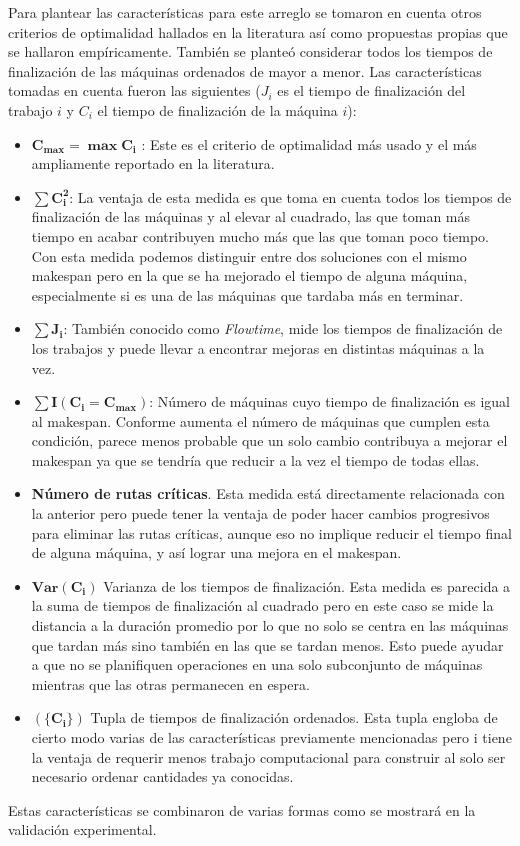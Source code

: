 Para plantear las características para este arreglo se tomaron en cuenta otros criterios de optimalidad hallados en la literatura así como propuestas 
propias que se hallaron empíricamente. 
%
También se planteó considerar todos los tiempos de finalización de las máquinas ordenados de mayor a menor.
%
Las características tomadas en cuenta fueron las siguientes ($J_i$ es el tiempo de finalización del trabajo $i$ y $C_i$ el tiempo de finalización de la máquina $i$):
\begin{itemize}
    \item $\mathbf{C_{max} = \max{C_i}}$ : Este es el criterio de optimalidad más usado y el más ampliamente reportado en la literatura. 
    \item $\mathbf{\sum C_i^2}$: La ventaja de esta medida es que toma en cuenta todos los tiempos de finalización de las máquinas y al elevar al cuadrado, 
		las que toman más tiempo en acabar contribuyen mucho más que las que toman poco tiempo. Con esta medida podemos distinguir entre dos soluciones con el mismo makespan 
		pero en la que se ha mejorado el tiempo de alguna máquina, especialmente si es una de las máquinas que tardaba más en terminar.
    \item $\mathbf{\sum J_i}$: También conocido como \textit{Flowtime}, mide los tiempos de finalización de los trabajos y puede llevar a encontrar mejoras en distintas 
		máquinas a la vez.
    \item $\mathbf{\sum I(C_i=C_{max})}$: Número de máquinas cuyo tiempo de finalización es igual al makespan. Conforme aumenta el número de máquinas que cumplen esta 
		condición, parece menos probable que un solo cambio contribuya a mejorar el makespan ya que se tendría que reducir a la vez el tiempo de todas ellas. 
    \item \textbf{Número de rutas críticas}. Esta medida está directamente relacionada con la anterior pero puede tener la ventaja de poder hacer cambios progresivos 
		para eliminar las rutas críticas, aunque eso no implique reducir el tiempo final de alguna máquina, y así lograr una mejora en el makespan. 
    \item $\mathbf{Var(C_i)}$ Varianza de los tiempos de finalización. Esta medida es parecida a la suma de tiempos de finalización al cuadrado pero en este caso se 
		mide la distancia a la duración promedio por lo que no solo se centra en las máquinas que tardan más sino también en las que se tardan menos. Esto puede ayudar a 
		que no se planifiquen operaciones en una solo subconjunto de máquinas mientras que las otras permanecen en espera.
    \item $\mathbf{(\{C_i\})}$ Tupla de tiempos de finalización ordenados. Esta tupla engloba de cierto modo varias de las características previamente mencionadas pero i
		tiene la ventaja de requerir menos trabajo computacional para construir al solo ser necesario ordenar cantidades ya conocidas.
\end{itemize}

Estas características se combinaron de varias formas como se mostrará en la validación experimental. 
